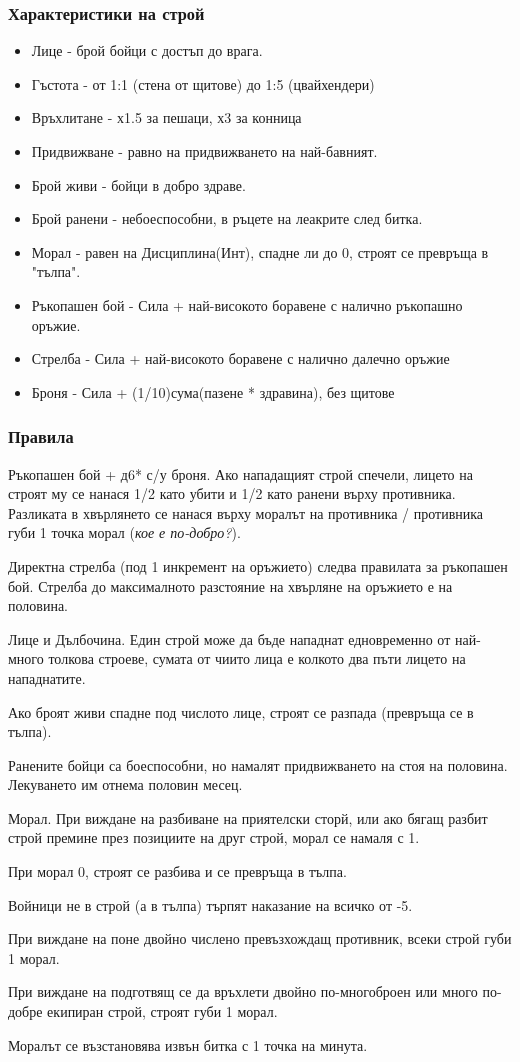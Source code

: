 \subsubsection{Характеристики на строй}
\begin{itemize}
\item{Лице - брой бойци с достъп до врага.}
\item{Гъстота - от 1:1 (стена от щитове) до 1:5 (цвайхендери)}
\item{Връхлитане - х1.5 за пешаци, х3 за конница}
\item{Придвижване - равно на придвижването на най-бавният.}

\item{Брой живи - бойци в добро здраве.}
\item{Брой ранени - небоеспособни, в ръцете на леакрите след битка.}
\item{Морал - равен на Дисциплина(Инт), спадне ли до 0, строят се превръща в "тълпа".}

\item{Ръкопашен бой - Сила + най-високото боравене с налично ръкопашно оръжие.}
\item{Стрелба - Сила + най-високото боравене с налично далечно оръжие}
\item{Броня - Сила + (1/10)сума(пазене * здравина), без щитове}
\end{itemize}

\subsubsection{Правила}
Ръкопашен бой + д6* с/у броня. Ако нападащият строй спечели, лицето на строят му се нанася 1/2 като убити и 1/2 като ранени върху противника. Разликата в хвърлянето се нанася върху моралът на противника / противника губи 1 точка морал (\textit{кое е по-добро?}).

Директна стрелба (под 1 инкремент на оръжието) следва правилата за ръкопашен бой. Стрелба до максималното разстояние на хвърляне на оръжието е на половина.

Лице и Дълбочина. Един строй може да бъде нападнат едновременно от най-много толкова строеве, сумата от чиито лица е колкото два пъти лицето на  нападнатите.

Ако броят живи спадне под числото лице, строят се разпада (превръща се в тълпа).

Ранените бойци са боеспособни, но намалят придвижването на стоя на половина. Лекуването им отнема половин месец.

Морал. При виждане на разбиване на приятелски сторй, или ако бягащ разбит строй премине през позициите на друг строй, морал се намаля с 1.

При морал 0, строят се разбива и се превръща в тълпа.

Войници не в строй (а в тълпа) търпят наказание на всичко от -5.

При виждане на поне двойно числено превъзхождащ противник, всеки строй губи 1 морал.

При виждане на подготвящ се да връхлети двойно по-многоброен или много по-добре екипиран строй, строят губи 1 морал.

Моралът се възстановява извън битка с 1 точка на минута.
